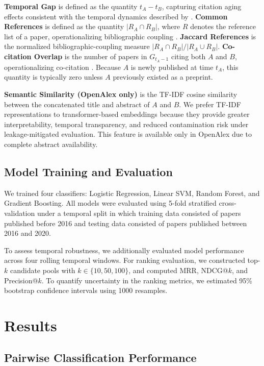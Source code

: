 \documentclass[11pt,a4paper]{article}
\begin{document}
\textbf{Temporal Gap} is defined as the quantity \(t_A - t_B\), capturing citation aging effects consistent with the temporal dynamics described by \citet{wang2013quantifying}. \textbf{Common References} is defined as the quantity \(|R_A \cap R_B|\), where \(R\) denotes the reference list of a paper, operationalizing bibliographic coupling \citep{kessler1963bibliographic}. \textbf{Jaccard References} is the normalized bibliographic-coupling measure \(|R_A \cap R_B| / |R_A \cup R_B|\). \textbf{Co-citation Overlap} is the number of papers in \(G_{t_A-1}\) citing both \(A\) and \(B\), operationalizing co-citation \citep{small1973co}. Because \(A\) is newly published at time \(t_A\), this quantity is typically zero unless \(A\) previously existed as a preprint.

\textbf{Semantic Similarity (OpenAlex only)} is the TF-IDF cosine similarity between the concatenated title and abstract of \(A\) and \(B\). We prefer TF-IDF representations to transformer-based embeddings because they provide greater interpretability, temporal transparency, and reduced contamination risk under leakage-mitigated evaluation. This feature is available only in OpenAlex due to complete abstract availability.

\subsection{Model Training and Evaluation}

We trained four classifiers: Logistic Regression, Linear SVM, Random Forest, and Gradient Boosting. All models were evaluated using 5-fold stratified cross-validation under a temporal split in which training data consisted of papers published before 2016 and testing data consisted of papers published between 2016 and 2020.

To assess temporal robustness, we additionally evaluated model performance across four rolling temporal windows. For ranking evaluation, we constructed top-\(k\) candidate pools with \(k \in \{10,50,100\}\), and computed MRR, NDCG@\(k\), and Precision@\(k\). To quantify uncertainty in the ranking metrics, we estimated 95\% bootstrap confidence intervals using 1000 resamples.

\section{Results}
\label{sec:results}

\subsection{Pairwise Classification Performance}
\end{document}
